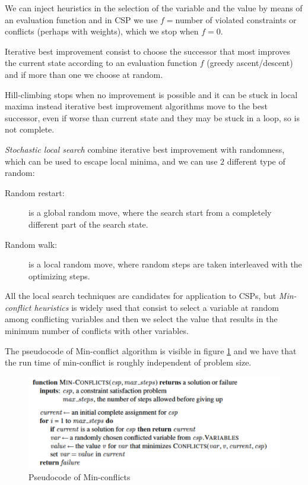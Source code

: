 We can inject heuristics in the selection of the variable and the value by means of
an evaluation function and in CSP we use $f = $number of violated constraints 
or conflicts (perhaps with weights), which we stop when $f = 0$.

Iterative best improvement consist to choose the successor that most improves 
the current state according to an evaluation function $f$ (greedy ascent/descent)
and if more than one we choose at random.

Hill-climbing stops when no improvement is possible and it can be stuck in local maxima
instead iterative best improvement algorithms move to the best successor, 
even if worse than current state and they may be stuck in a loop, so is not complete.

\emph{Stochastic local search} combine iterative best improvement with randomness,
which can be used to escape local minima, and we can use $2$ different type of random:
\begin{description}
    \item [Random restart:] is a global random move, where the search start from a 
	    completely different part of the search state.
    \item [Random walk: ] is a local random move, where random steps are taken 
	    interleaved with the optimizing steps.
\end{description}
All the local search techniques are candidates for application to CSPs, but 
\emph{Min-conflict heuristics} is widely used that consist to select a variable at
random among conflicting variables and then we select the value that results in the 
minimum number of conflicts with other variables.

The pseudocode of Min-conflict algorithm is visible in figure \ref{img:min_conflict}
and we have that the run time of min-conflict is roughly independent of problem size.

\begin{figure}
	\includegraphics[width=\textwidth]{Images/min-conflicts}
	\caption{Pseudocode of Min-conflicts}
	\label{img:min_conflict}
\end{figure}

